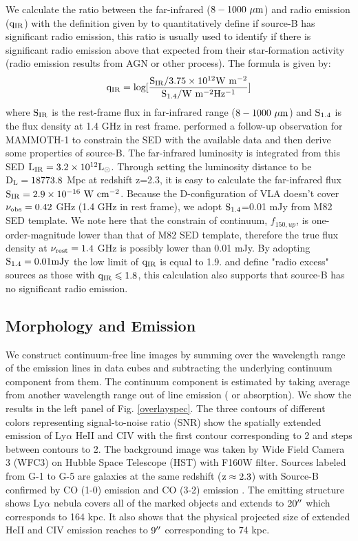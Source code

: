	 We calculate the ratio between the far-infrared ($\rm 8-1000 \ \mu m$) and radio emission ($\rm q_{IR}$) with the definition given by \cite{ivison2010far} to quantitatively define if source-B has significant radio emission, this ratio is usually used to identify if there is significant radio emission above that expected from their star-formation activity (radio emission results from AGN or other process). The formula is given by:
	\begin{equation}
		\rm q_{IR}=log[\frac{S_{IR}/3.75 \times 10^{12} W \ m^{-2}}{S_{1.4}/W \ m^{-2} Hz^{-1}}]
		\label{q_IR}
	\end{equation}
	where $\rm S_{IR}$ is the rest-frame flux in far-infrared range ($8-1000 \ \rm \mu m $) and $\rm S_{1.4}$ is the flux density at 1.4 GHz in rest frame. \citet{arrigoni2018overdensity} performed a follow-up observation for MAMMOTH-1 to constrain the SED with the available data and then derive some properties of source-B. The far-infrared luminosity is integrated from this SED $\rm L_{IR}=3.2 \times 10^{12}L_{\odot}$. Through setting the luminosity distance to be $\rm D_{L}=18773.8$ Mpc at redshift z=2.3, it is easy to calculate the far-infrared flux $\rm S_{IR}=2.9 \times 10^{-16}\ W \ cm^{-2}$.  Because the D-configuration of VLA doesn't cover $\rm \nu_{obs}=0.42$ GHz (1.4 GHz in rest frame), we adopt $\rm S_{1.4}$=0.01 mJy from M82 SED template. We note here that the constrain of continuum, $f_{150,up}$, is one-order-magnitude lower than that of M82 SED template, therefore the true flux density at $\rm \nu_{rest}=1.4$ GHz is possibly lower than 0.01 mJy. By adopting $\rm S_{1.4}=0.01 mJy$ the low limit of $\rm q_{IR}$ is equal to 1.9. \citet{ivison2010far} and \citet{del2013goods} define "radio excess" sources as those with $\rm q_{IR} \leqslant 1.8$, this calculation also supports that source-B has no significant radio emission.


\subsection{Morphology and Emission}

We construct continuum-free line images by summing over the wavelength range of the emission lines in data cubes and subtracting the underlying continuum component from them. The continuum component is estimated by taking average from another wavelength range out of line emission ( or absorption). We show the results in the left panel of Fig. \ref{overlayspec}. The three contours of different colors representing signal-to-noise ratio (SNR) show the spatially extended emission of Ly$\alpha$ HeII and CIV with the first contour corresponding to 2 and steps between contours to 2. The background image was taken by Wide Field Camera 3 (WFC3) on Hubble Space Telescope (HST) with F160W filter. Sources labeled from G-1 to G-5 are galaxies at the same redshift ($\rm z \approx 2.3$) with Source-B confirmed by CO (1-0) emission and CO (3-2) emission \citep{emonts2019cold,qiongli2020}. The emitting structure shows Ly$\alpha$ nebula covers all of the marked objects and extends to $\rm 20\mbox{$^{\prime\prime}$}$ which corresponds to 164 kpc. It also shows that the physical projected size of extended HeII and CIV emission reaches to $9 \mbox{$^{\prime\prime}$}$ corresponding to 74 kpc.

